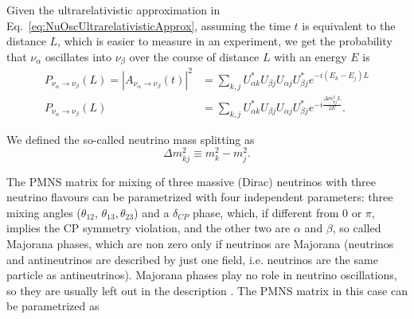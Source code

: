 Given the ultrarelativistic approximation in Eq.~\ref{eq:NuOscUltrarelativisticApprox}, assuming the time $t$ is equivalent to the distance $L$, which is easier to measure in an experiment, we get the probability that $\nu_\alpha$ oscillates into $\nu_\beta$ over the course of distance $L$ with an energy $E$ is
\begin{align}
P_{\nu_{\alpha}\rightarrow\nu_{\beta}}\left( L\right) =
\left|A_{\nu_\alpha\rightarrow\nu_\beta}\left(t\right)\right|^2 &=
\sum_{k, j}U_{\alpha k}^*U_{\beta j}U_{\alpha j}U_{\beta j}^*e^{-i\left(E_k-E_j\right)L}\\
P_{\nu_{\alpha}\rightarrow\nu_{\beta}}\left( L\right) &= \sum_{k, j}U_{\alpha k}^*U_{\beta j}U_{\alpha j}U_{\beta j}^*e^{-i\frac{\Delta m_{kj}^2 L}{2E}}.
\end{align}

We defined the so-called neutrino mass splitting as
\begin{equation}\label{Deltamsq}
\Delta m_{kj}^{2}\equiv m_{k}^{2}-m_{j}^{2}.
\end{equation}

The \gls{PMNS} matrix for mixing of three massive (Dirac) neutrinos with three neutrino flavours can be parametrized with four independent parameters: three mixing angles ($\theta_{12}$, $\theta_{13}, \theta_{23}$) and a $\delta_{CP}$ phase, which, if different from 0 or $\pi$, implies the \gls{CP} symmetry violation, and the other two are $\alpha$ and $\beta$, so called Majorana phases, which are non zero only if neutrinos are Majorana (neutrinos and antineutrinos are described by just one field, i.e. neutrinos are the same particle as antineutrinos). Majorana phases play no role in neutrino oscillations, so they are usually left out in the description \cite{PDG.pdf}. The PMNS matrix in this case can be parametrized as

